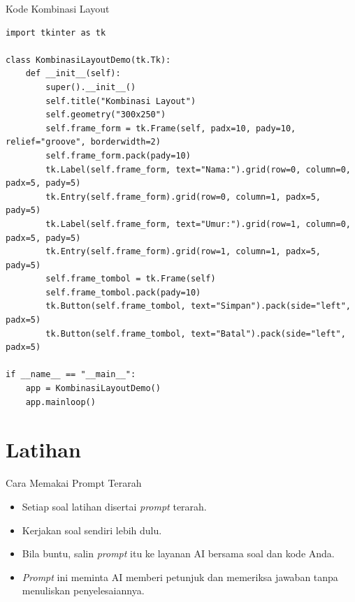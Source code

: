 \documentclass[aspectratio=169, table]{beamer}
\begin{document}
\begin{frame}[fragile]{Kode Kombinasi Layout}
\vspace{20pt}
\begin{lstlisting}[style=PythonStyle, basicstyle=\ttfamily\scriptsize]
import tkinter as tk

class KombinasiLayoutDemo(tk.Tk):
	def __init__(self):
		super().__init__()
		self.title("Kombinasi Layout")
		self.geometry("300x250")
		self.frame_form = tk.Frame(self, padx=10, pady=10, relief="groove", borderwidth=2)
		self.frame_form.pack(pady=10)
		tk.Label(self.frame_form, text="Nama:").grid(row=0, column=0, padx=5, pady=5)
		tk.Entry(self.frame_form).grid(row=0, column=1, padx=5, pady=5)
		tk.Label(self.frame_form, text="Umur:").grid(row=1, column=0, padx=5, pady=5)
		tk.Entry(self.frame_form).grid(row=1, column=1, padx=5, pady=5)
		self.frame_tombol = tk.Frame(self)
		self.frame_tombol.pack(pady=10)
		tk.Button(self.frame_tombol, text="Simpan").pack(side="left", padx=5)
		tk.Button(self.frame_tombol, text="Batal").pack(side="left", padx=5)

if __name__ == "__main__":
	app = KombinasiLayoutDemo()
	app.mainloop()
\end{lstlisting}
\end{frame}

\section{Latihan}
\begin{frame}{Cara Memakai Prompt Terarah}
\begin{itemize}
\item Setiap soal latihan disertai \textit{prompt} terarah.
\item Kerjakan soal sendiri lebih dulu.
\item Bila buntu, salin \textit{prompt} itu ke layanan AI bersama soal dan kode Anda.
\item \textit{Prompt} ini meminta AI memberi petunjuk dan memeriksa jawaban tanpa menuliskan penyelesaiannya.
\end{itemize}
\end{frame}
\end{document}
